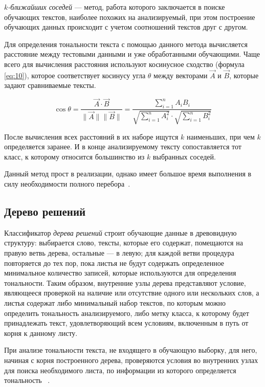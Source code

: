 \textit{$k$-ближайших соседей} --- метод, работа которого заключается в
поиске обучающих текстов, наиболее похожих на анализируемый, при этом построение
обучающих данных происходит с учетом соотношений текстов друг с другом.

Для определения тональности текста с помощью данного метода вычисляется
расстояние между тестовыми данными и уже обработанными обучающими. Чаще всего
для вычисления расстояния используют косинусное сходство (формула \ref{eq:10}),
которое соответствует косинусу угла $\theta$ между векторами $\vec{A}$ и
$\vec{B}$, которые задают сравниваемые тексты.

\begin{equation}\label{eq:10}
    \cos{\theta} = \frac{\vec{A} \cdot \vec{B}}{\|\vec{A}\|\|\vec{B}\|} =
    \frac{\sum\limits_{i=1}^n{A_iB_i}}{\sqrt{\sum\limits_{i=1}^n{A_i^2}} \cdot
    \sqrt{\sum\limits_{i=1}^n{B_i^2}}}
\end{equation}

После вычисления всех расстояний в их наборе ищутся $k$ наименьших, при чем $k$
определяется заранее. И в конце анализируемому тексту сопоставляется тот класс,
к которому относится большинство из $k$ выбранных соседей.

Данный метод прост в реализации, однако имеет большое время выполнения в силу
необходимости полного перебора~\cite{article19}.

\subsection{Дерево решений}

Классификатор \textit{дерева решений} строит обучающие данные в древовидную
структуру: выбирается слово, тексты, которые его содержат, помещаются на правую
ветвь дерева, остальные --- в левую; для каждой ветви процедура повторяется до
тех пор, пока листья не будут содержать определенное минимальное количество
записей, которые используются для определения тональности. Таким образом,
внутренние узлы дерева представляют условие, являющееся проверкой на наличие
или отсутствие одного или нескольких слов, а листья содержат либо минимальный
набор текстов, по которым можно определить тональность анализируемого, либо
метку класса, к которому будет принадлежать текст, удовлетворяющий всем
условиям, включенным в путь от корня к данному листу.

При анализе тональности текста, не входящего в обучающую выборку, для него,
начиная с корня построенного дерева, проверяются условия во внутренних узлах для
поиска необходимого листа, по информации из которого определяется тональность
~\cite{article4}.


